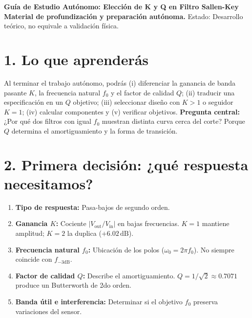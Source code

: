 \documentclass[10pt, a4paper]{article}
\begin{document}
\begin{center}
    {\Large\textbf{\textcolor{ucbblue}{Guía de Estudio Autónomo: Elección de K y Q en Filtro Sallen-Key}}} \\[0.1cm]
    {\footnotesize\textbf{Material de profundización y preparación autónoma.} Estado: Desarrollo teórico, no equivale a validación física.}
\end{center}

\section*{1. Lo que aprenderás}
Al terminar el trabajo autónomo, podrás (i) diferenciar la ganancia de banda pasante $K$, la frecuencia natural $f_0$ y el factor de calidad $Q$; (ii) traducir una especificación en un $Q$ objetivo; (iii) seleccionar diseño con $K>1$ o seguidor $K=1$; (iv) calcular componentes y (v) verificar objetivos.
\textbf{Pregunta central:} ¿Por qué dos filtros con igual $f_0$ muestran distinta curva cerca del corte? Porque $Q$ determina el amortiguamiento y la forma de transición.

\section*{2. Primera decisión: ¿qué respuesta necesitamos?}
\begin{enumerate}
    \setlength{\itemsep}{1pt}
    \item \textbf{Tipo de respuesta:} Pasa-bajos de segundo orden.
    \item \textbf{Ganancia $K$:} Cociente $|V_{\mathrm{out}}/V_{\mathrm{in}}|$ en bajas frecuencias. $K=1$ mantiene amplitud; $K=2$ la duplica ($+6.02\,\mathrm{dB}$).
    \item \textbf{Frecuencia natural $f_0$:} Ubicación de los polos ($\omega_0=2\pi f_0$). No siempre coincide con $f_{-3\mathrm{dB}}$.
    \item \textbf{Factor de calidad $Q$:} Describe el amortiguamiento. $Q=1/\sqrt{2} \approx 0.7071$ produce un Butterworth de 2do orden.
    \item \textbf{Banda útil e interferencia:} Determinar si el objetivo $f_0$ preserva variaciones del sensor.
\end{enumerate}
\end{document}
